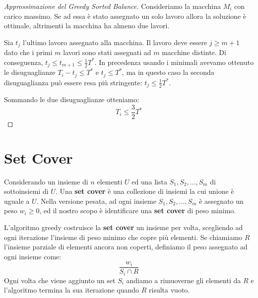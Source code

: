 \documentclass[\main/main.tex]{subfiles}
\begin{document}
\begin{proof}[Approssimazione del Greedy Sorted Balance]
    Consideriamo la macchina \(M_i\) con carico massimo. Se ad essa è stato assegnato un solo lavoro allora la soluzione è ottimale, altrimenti la macchina ha almeno due lavori.
    
    Sia \(t_j\) l'ultimo lavoro assegnato alla macchina. Il lavoro deve essere \(j \geq m+1\) dato che i primi \(m\) lavori sono stati assegnati ad \(m\) macchine distinte. Di conseguenza, \(t_j \leq t_{m+1} \leq \frac{1}{2} T^*\). In precedenza usando i minimali avevamo ottenuto le disuguaglianze \(T_{i}-t_{j} \leq T^{*}\) e \(t_{j} \leq T^{*}\), ma in questo caso la seconda disuguaglianza può essere resa più stringente: \(t_{j} \leq \frac{1}{2} T^{*}\).
    
    Sommando le due disuguaglianze otteniamo:
    \[
        T_{i} \leq \frac{3}{2} T^{*}
    \]
\end{proof}
\section{Set Cover}
\begin{problem}
    Considerando un insieme di \(n\) elementi \(U\) ed una lista \(S_1, S_2, \ldots, S_m\) di sottoinsiemi di \(U\). Una \textbf{set cover} è una collezione di insiemi la cui unione è uguale a \(U\). Nella versione pesata, ad ogni insieme \(S_1, S_2, \ldots, S_m\) è assegnato un peso \(w_i \geq 0\), ed il nostro scopo è identificare una \textbf{set cover} di peso minimo.
\end{problem}
\begin{definition}
    L'algoritmo greedy costruisce la \textbf{set cover} un insieme per volta, scegliendo ad ogni iterazione l'insieme di peso minimo che copre più elementi. Se chiamiamo \(R\) l'insieme parziale di elementi ancora non coperti, definiamo il peso assegnato ad ogni insieme come:
    \[
        \frac{w_i}{S_i \cap R}
    \]
    Ogni volta che viene aggiunto un set \(S_i\) andiamo a rimuoverne gli elementi da \(R\) e l'algoritmo termina la sua iterazione quando \(R\) risulta vuoto.
\end{definition}
\end{document}
